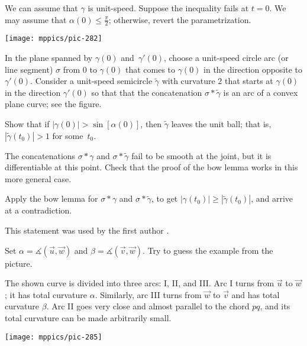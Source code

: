 \begin{multicols}{2}
We can assume that $\gamma$ is unit-speed.
Suppose the inequality fails at $t=0$.
We may assume that $\alpha(0)\le\tfrac\pi2$;
otherwise, revert the parametrization.

\begin{Figure}
\vskip-1mm
\centering
\texttt{[image: mppics/pic-282]}
\vskip-1mm
\end{Figure}

In the plane spanned by $\gamma(0)$ and~$\gamma'(0)$, choose a unit-speed circle arc (or line segment) $\sigma$ from $0$ to $\gamma(0)$ that comes to $\gamma(0)$ in the direction opposite to $\gamma'(0)$.
Consider a unit-speed semicircle $\tilde\gamma$ with curvature $2$
that starts at $\gamma(0)$ in the direction $\gamma'(0)$ so that that the concatenation $\sigma*\tilde\gamma$ is an arc of a convex plane curve; see the figure.

Show that if $|\gamma(0)|> \sin[\alpha(0)]$, then $\tilde\gamma$ leaves the unit ball; that is, $|\tilde\gamma(t_0)|>1$ for some~$t_0$.

The concatenations $\sigma*\gamma$ and $\sigma*\tilde\gamma$ fail to be smooth at the joint, but it is differentiable at this point.
Check that the proof of the bow lemma works in this more general case.

Apply the bow lemma for $\sigma*\gamma$ and $\sigma*\tilde\gamma$, to get $|\gamma(t_0)|\ge |\tilde\gamma(t_0)|$, and arrive at a contradiction.

 This statement was used by the first author \cite{petrunin2023}.


Set $\alpha=\measuredangle(\vec u,\vec w)$ 
and $\beta=\measuredangle(\vec v,\vec w)$.
Try to guess the example from the picture.

The shown curve is divided into three arcs: I, II, and III. 
Arc I turns from $\vec u$ to $\vec w$;
it has total curvature $\alpha$.
Similarly, arc III turns from $\vec w$ to $\vec v$ and has total curvature $\beta$. 
Arc II goes very close and almost parallel to the chord $pq$, and its total curvature can be made arbitrarily small.

\begin{Figure}
\vskip-1mm
\centering
\texttt{[image: mppics/pic-285]}
\vskip-1mm
\end{Figure}



\end{multicols}
